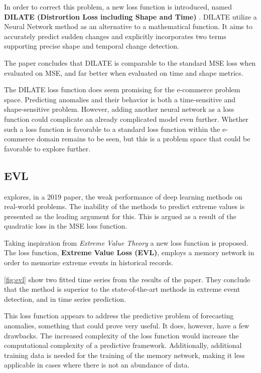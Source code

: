 In order to correct this problem, a new loss function is introduced, named 
\textbf{DILATE (Distrortion Loss including Shape and Time)} \cite{Guen2019}.
DILATE utilize a Neural Network method as an alternative to a mathematical function. 
It aims to accurately predict sudden changes and explicitly incorporates two terms
supporting precise shape and temporal change detection.

The paper concludes that DILATE is comparable to the standard MSE loss when evaluated on MSE,
and far better when evaluated on time and shape metrics.

The DILATE loss function does seem promising for the e-commerce problem space.
Predicting anomalies and their behavior is both a time-sensitive and shape-sensitive problem.
However, adding another neural network as a loss function could complicate an already complicated model even further.
Whether such a loss function is favorable to a standard loss function within the e-commerce domain remains to be seen,
but this is a problem space that could be favorable to explore further.

\subsection{EVL}
\citeauthor{Ding2019} explores, in a 2019 paper, the weak performance of deep learning methods on real-world problems.
The inability of the methods to predict extreme values is presented as the leading argument for this.
This is argued as a result of the quadratic loss in the MSE loss function.

Taking inspiration from \textit{Extreme Value Theory} a new loss function is proposed.
The loss function, \textbf{Extreme Value Loss (EVL)},
employs a memory network in order to memorize extreme events in historical records.

\autoref{fig:evl} show two fitted time series from the results of the paper. They conclude
that the method is superior to the state-of-the-art methods in extreme event detection, and 
in time series prediction.

This loss function appears to address the predictive problem of forecasting anomalies,
something that could prove very useful.
It does, however, have a few drawbacks.
The increased complexity of the loss function would increase the computational complexity of a predictive framework.
Additionally, additional training data is needed for the training of the memory network,
making it less applicable in cases where there is not an abundance of data.

